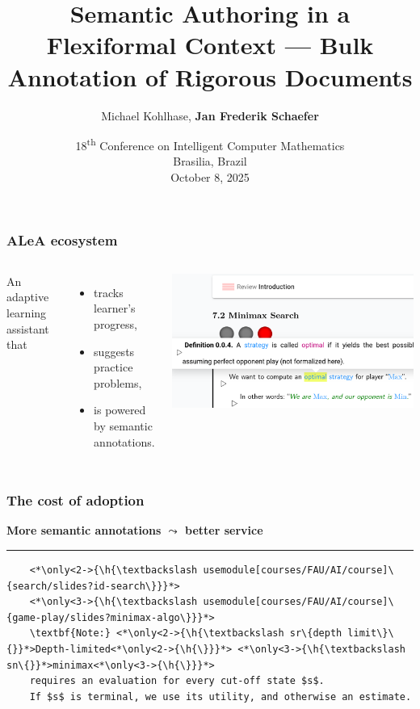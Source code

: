 \documentclass[aspectratio=169]{beamer}
\title{Semantic Authoring in a Flexiformal Context --- Bulk Annotation of Rigorous Documents}
\author{Michael Kohlhase, \bf Jan Frederik Schaefer}
\institute{FAU Erlangen-N\"urnberg}
\date{18\textsuperscript{th} Conference on Intelligent Computer Mathematics\\Brasilia, Brazil\\October 8, 2025}
\begin{document}
\frame\titlepage


\begin{frame}
    \frametitle{ALeA ecosystem}
    \begin{columns}
        An adaptive learning assistant that
        \begin{itemize}
            \item tracks learner's progress,
            \item suggests practice problems,
            \item is powered by semantic annotations.
        \end{itemize}
        \centering\includegraphics[width=\textwidth]{alea1.png}
    \end{columns}
\end{frame}

\begin{frame}[fragile]
    \frametitle{The cost of adoption}
    \centering
    {\bf More semantic annotations $\bm\leadsto$ better service}

    \noindent\rule{\textwidth}{0.8pt}
    \def\h#1{\colorbox{yellow!50!red!70}{#1}}
    \begin{lstlisting}
    <*\only<2->{\h{\textbackslash usemodule[courses/FAU/AI/course]\{search/slides?id-search\}}}*>
    <*\only<3->{\h{\textbackslash usemodule[courses/FAU/AI/course]\{game-play/slides?minimax-algo\}}}*>
    \textbf{Note:} <*\only<2->{\h{\textbackslash sr\{depth limit\}\{}}*>Depth-limited<*\only<2->{\h{\}}}*> <*\only<3->{\h{\textbackslash sn\{}}*>minimax<*\only<3->{\h{\}}}*>
    requires an evaluation for every cut-off state $s$.
    If $s$ is terminal, we use its utility, and otherwise an estimate.
    \end{lstlisting}
\end{frame}
\end{document}
